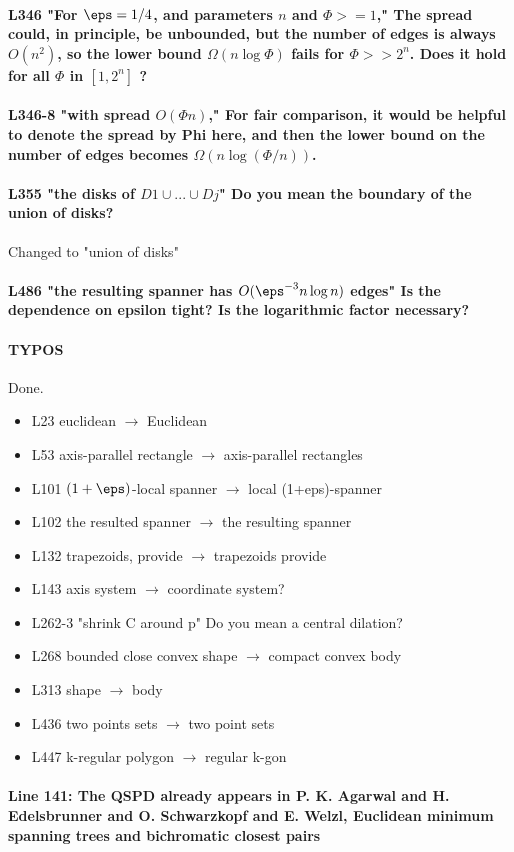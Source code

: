 \paragraph{L346 "For $\eps=1/4$, and parameters $n$ and $\Phi>=1$," The spread could, in principle, be unbounded, but the number of edges is always $O(n^2)$, so the lower bound $\Omega(n \log \Phi)$ fails for $\Phi>>2^n$. Does it hold for all $\Phi$ in $[1,2^n]$ ?}

\paragraph{L346-8 "with spread $O(\Phi n)$," For fair comparison, it would be helpful to denote the spread by Phi here, and then the lower bound on the number of edges becomes $\Omega(n \log(\Phi/n))$.}

\paragraph{L355 "the disks of $D1 \cup ... \cup Dj$" Do you mean the boundary of the union of disks?} Changed to "union of disks"

\paragraph{L486 "the resulting spanner has $O(\eps^{-3} n \log n)$ edges" Is the dependence on epsilon tight? Is the logarithmic factor necessary?}


\paragraph{TYPOS} Done.
\begin{itemize}
	\item L23 euclidean $\rightarrow$ Euclidean
	\item L53 axis-parallel rectangle $\rightarrow$ axis-parallel rectangles
	\item L101 $(1+\eps)$-local spanner $\rightarrow$ local (1+eps)-spanner
	\item L102 the resulted spanner $\rightarrow$ the resulting spanner
	\item L132 trapezoids, provide $\rightarrow$ trapezoids provide
	\item L143 axis system $\rightarrow$ coordinate system?
	\item L262-3 "shrink C around p" Do you mean a central dilation?
	\item L268 bounded close convex shape $\rightarrow$ compact convex body
	\item L313 shape $\rightarrow$ body
	\item L436 two points sets $\rightarrow$ two point sets
	\item L447 k-regular polygon $\rightarrow$ regular k-gon
\end{itemize}


\paragraph{Line 141: The QSPD already appears in P. K. Agarwal and H. Edelsbrunner and O. Schwarzkopf and E. Welzl, Euclidean minimum spanning trees and bichromatic closest pairs}

